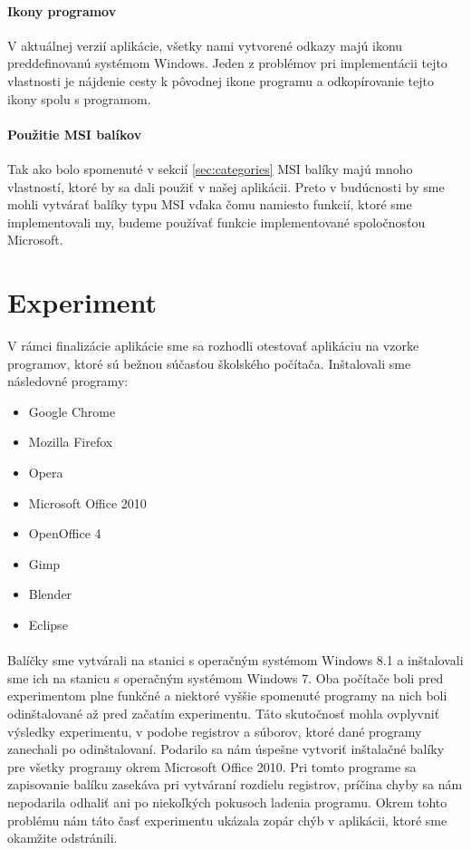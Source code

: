 \paragraph{Ikony programov}
V aktuálnej verzií aplikácie, všetky nami vytvorené odkazy majú ikonu preddefinovanú systémom Windows. Jeden z problémov pri implementácii tejto vlastnosti je nájdenie cesty k pôvodnej ikone programu a odkopírovanie tejto ikony spolu s programom. 

\paragraph{Použitie MSI balíkov}
Tak ako bolo spomenuté v sekcií \ref{sec:categories} MSI balíky majú mnoho vlastností, ktoré by sa dali použiť v našej aplikácii. Preto v budúcnosti by sme mohli vytvárať balíky typu MSI vďaka čomu namiesto funkcií, ktoré sme implementovali my, budeme používať funkcie implementované spoločnosťou Microsoft. 

\section{Experiment}
\label{sec:experiment}
V rámci finalizácie aplikácie sme sa rozhodli otestovať aplikáciu na vzorke programov, ktoré sú bežnou súčasťou školského počítača. Inštalovali sme následovné programy:
\begin{itemize}
\item Google Chrome
\item Mozilla Firefox
\item Opera
\item Microsoft Office 2010
\item OpenOffice 4
\item Gimp
\item Blender
\item Eclipse
\end{itemize}
\paragraph{}
Balíčky sme vytvárali na stanici s operačným systémom Windows 8.1 a inštalovali sme ich na stanicu s operačným systémom Windows 7. Oba počítače boli pred experimentom plne funkčné a niektoré vyššie spomenuté programy na nich boli odinštalované až pred začatím experimentu. Táto skutočnosť mohla ovplyvniť výsledky experimentu, v podobe registrov a súborov, ktoré dané programy zanechali po odinštalovaní. Podarilo sa nám úspešne vytvoriť inštalačné balíky pre všetky programy okrem Microsoft Office 2010. Pri tomto programe sa zapisovanie balíku zasekáva pri vytváraní rozdielu registrov, príčina chyby sa nám nepodarila odhaliť ani po niekoľkých pokusoch ladenia programu. Okrem tohto problému nám táto časť experimentu ukázala zopár chýb v aplikácii, ktoré sme okamžite odstránili. 
